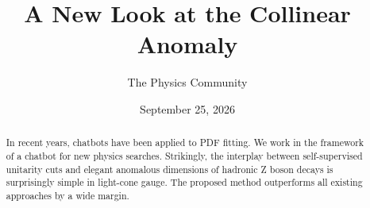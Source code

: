 \documentclass[11pt]{article}
\title{A New Look at the Collinear Anomaly}
\author{The Physics Community}
\date{September 25, 2026}
\numberwithin{equation}{section}
\theoremstyle{definition}
\theoremstyle{remark}
\begin{document}
\maketitle
\begin{abstract}
In recent years, chatbots have been applied to PDF fitting. We work in
the framework of a chatbot for new physics searches. Strikingly, the
interplay between self-supervised unitarity cuts and elegant anomalous
dimensions of hadronic Z boson decays is surprisingly simple in
light-cone gauge. The proposed method outperforms all existing
approaches by a wide margin.
\end{abstract}
\tableofcontents




\nocite{*}


\end{document}
